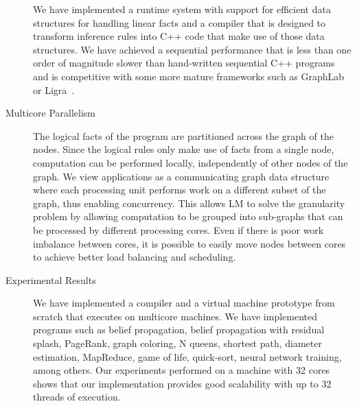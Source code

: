 \begin{description}
   We have implemented a runtime system with support for efficient data
   structures for handling linear facts and a compiler that is designed to
   transform inference rules into C++ code that make use of those data
   structures. We have achieved a sequential performance that is less than one
   order of magnitude slower than hand-written sequential C++ programs and is
   competitive with some more mature frameworks such as
   GraphLab~\cite{GraphLab2010} or Ligra~\cite{Shun:2013:LLG:2517327.2442530}.

   \item[Multicore Parallelism]
   
   The logical facts of the program are partitioned across the graph of the
   nodes. Since the logical rules only make use of facts from a single node,
   computation can be performed locally, independently of other nodes of the
   graph. We view applications as a communicating graph data structure where
   each processing unit performs work on a different subset of the graph, thus
   enabling concurrency. This allows LM to solve the granularity problem by
   allowing computation to be grouped into sub-graphs that can be processed by
   different processing cores. Even if there is poor work imbalance between
   cores, it is possible to easily move nodes between cores to achieve better
   load balancing and scheduling.

   \item[Experimental Results]

   We have implemented a compiler and a virtual machine prototype from scratch
   that executes on multicore machines.  We have implemented programs such as
   belief propagation, belief propagation with residual splash, PageRank, graph
   coloring, N queens, shortest path, diameter estimation, MapReduce, game of
   life, quick-sort, neural network training, among others. Our experiments
   performed on a machine with 32 cores shows that our implementation provides
   good scalability with up to 32 threads of execution.
      
\end{description}

